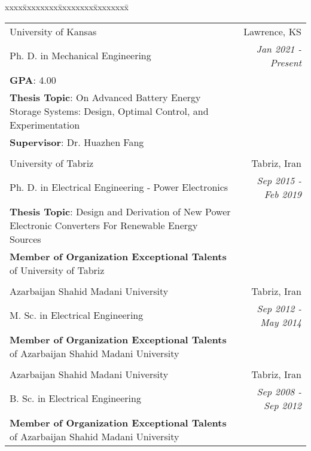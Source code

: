 \documentclass[10pt,letter]{article}
\begin{document}
\begin{small}
\renewcommand{\arraystretch}{1.2}

\begin{tabbing}
xxxx\=xxxxxxxx\=xxxxxxxx\=xxxxxxxx\=\kill

\>\begin{tabular*}{0.9\linewidth}{l@{\extracolsep{\fill}}r}
University of Kansas & Lawrence, KS \\
Ph. D. in Mechanical Engineering  &  {\it Jan 2021 - Present}\\
\textbf{GPA}: 4.00 & \\
\parbox[l]{12cm}{\vspace{3pt}\textbf{Thesis Topic}: On Advanced Battery Energy Storage Systems: Design, Optimal Control, and Experimentation\vspace{3pt}} & \\ 
\textbf{Supervisor}: Dr. Huazhen Fang & \\
 & \\

University of Tabriz & Tabriz, Iran \\
Ph. D. in Electrical Engineering - Power Electronics & {\it Sep 2015 - Feb 2019}\\
\parbox[l]{11.5cm}{\vspace{3pt} \textbf{Thesis Topic}: Design and Derivation of New Power Electronic Converters For Renewable Energy Sources \vspace{3pt}} & \\ 
\textbf{Member of Organization Exceptional Talents} of University of Tabriz & \\
 & \\

Azarbaijan Shahid Madani University & Tabriz, Iran \\
M. Sc. in Electrical Engineering & {\it  Sep 2012 - May 2014} \\
\textbf{Member of Organization Exceptional Talents} of Azarbaijan Shahid Madani University & \\
\\
Azarbaijan Shahid Madani University & Tabriz, Iran \\
B. Sc. in Electrical Engineering & {\it Sep 2008 - Sep 2012} \\
\textbf{Member of Organization Exceptional Talents} of Azarbaijan Shahid Madani University & \\

\end{tabular*}
\end{tabbing}


\end{small}
\end{document}
